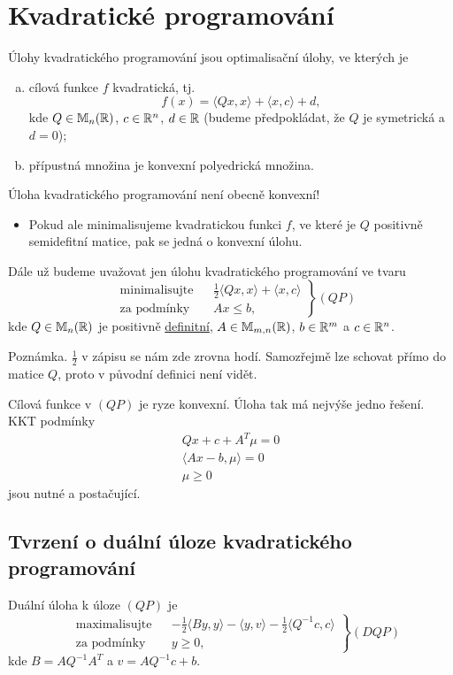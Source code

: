 \section{Kvadratické programování}
Úlohy kvadratického programování jsou optimalisační úlohy, ve kterých je
\begin{enumerate}[(a)]
    \item cílová funkce $f$ kvadratická, tj.
    \[
        f(x) = \langle Qx, x\rangle + \langle x,c\rangle + d,
    \]
    kde $Q \in \mathbb{M}_n (\mathbb{R})$, $c \in \mathbb{R}^n$, $d \in \mathbb{R}$ (budeme předpokládat, že $Q$ je symetrická a $d=0$);
    \item přípustná množina je konvexní polyedrická množina.
\end{enumerate}
Úloha kvadratického programování není obecně konvexní!
\begin{itemize}
    \item Pokud ale minimalisujeme kvadratickou funkci $f$, ve které je $Q$ positivně semidefitní matice, pak se jedná o 
    konvexní úlohu.
\end{itemize}
Dále už budeme uvažovat jen úlohu kvadratického programování ve tvaru
\[
\left.\begin{aligned}
    &\text{minimalisujte}&& \frac{1}{2}\langle Qx, x \rangle + \langle x,c\rangle \\
    &\text{za podmínky}  && Ax \leq b, 
\end{aligned}
\right\} (QP)
\]
kde $Q \in \mathbb{M}_n(\mathbb{R})$ je positivně \underline{definitní}, $A \in \mathbb{M}_{m,n}(\mathbb{R})$, $b \in \mathbb{R}^m$ a $c \in \mathbb{R}^n$.

Poznámka. $\frac{1}{2}$ v zápisu se nám zde zrovna hodí. Samozřejmě lze schovat přímo do matice $Q$, proto v původní 
definici není vidět.

Cílová funkce v $(QP)$ je ryze konvexní. Úloha tak má nejvýše jedno řešení. KKT podmínky
\begin{align*}
    Qx + c + A^T \mu = 0 \\
    \langle Ax - b, \mu\rangle = 0 \\
    \mu \geq 0
\end{align*}
jsou nutné a postačující.

\subsection{Tvrzení o duální úloze kvadratického programování}
Duální úloha k úloze $(QP)$ je
\[
\left.\begin{aligned}
    &\text{maximalisujte}&& -\frac{1}{2}\langle By, y \rangle - \langle y,v\rangle - \frac{1}{2}\langle Q^{-1}c, c\rangle \\
    &\text{za podmínky}  && y \geq 0, 
\end{aligned}
\right\} (DQP)
\]
kde $B = AQ^{-1}A^T$ a $v = AQ^{-1}c + b$.

